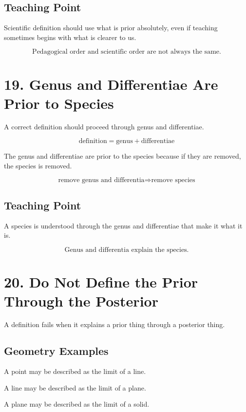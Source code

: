 \documentclass[12pt]{article}
\begin{document}
\subsection*{Teaching Point}

Scientific definition should use what is prior absolutely, even if teaching
sometimes begins with what is clearer to us.

\[
\boxed{
\text{Pedagogical order and scientific order are not always the same.}
}
\]

\section*{19. Genus and Differentiae Are Prior to Species}

A correct definition should proceed through genus and differentiae.

\[
\text{definition} = \text{genus} + \text{differentiae}
\]

The genus and differentiae are prior to the species because if they are removed,
the species is removed.

\[
\text{remove genus and differentia}
\Rightarrow
\text{remove species}
\]

\subsection*{Teaching Point}

A species is understood through the genus and differentiae that make it what it
is.

\[
\boxed{
\text{Genus and differentia explain the species.}
}
\]

\section*{20. Do Not Define the Prior Through the Posterior}

A definition fails when it explains a prior thing through a posterior thing.

\subsection*{Geometry Examples}

A point may be described as the limit of a line.

A line may be described as the limit of a plane.

A plane may be described as the limit of a solid.
\end{document}
